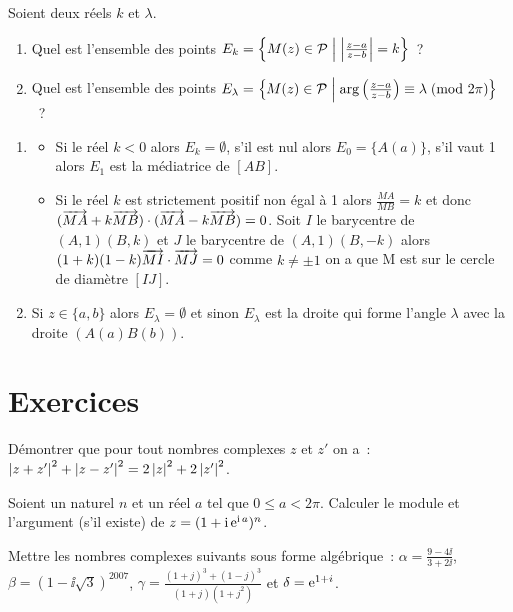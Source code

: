 Soient deux réels \(k\) et \(\lambda\).
\begin{enumerate}
  \item Quel est l'ensemble des points \(E_k = \left\{M(z) \in 
    \mathcal{P}\mathrel{}\middle|\mathrel{}\left\lvert\frac{z-a}{z-b}\right\rvert = k\right\}\)~?
  \item Quel est l'ensemble des points \(E_\lambda = \left\{M(z) \in 
    \mathcal{P}\mathrel{}\middle|\mathrel{}\arg \left(\frac{z-a}{z-b} \right) \equiv \lambda\!\pmod {2\pi}\right\}\)~?
\end{enumerate}
\begin{enumerate}
  \item 
    \begin{itemize}
      \item Si le réel \(k<0\) alors \(E_k = \emptyset\), s'il est nul 
        alors \(E_0 = \{A(a)\}\), s'il vaut 1 alors \(E_1\) est la 
        médiatrice de \([AB]\).
      \item Si le réel \(k\) est strictement positif non égal à 1 alors 
        \(\frac{MA}{MB} = k\) et donc \((\overrightarrow{MA} + k\overrightarrow{MB}) \cdot 
        (\overrightarrow{MA}-k\overrightarrow{MB}) = 0\). Soit \(I\) le barycentre de 
        \((A,1)(B,k)\) et \(J\) le barycentre de \((A,1)(B,-k)\) alors 
        \((1 + k)(1-k) \overrightarrow{MI} \cdot \overrightarrow{MJ}  = 0\) comme \(k \neq 
        \pm 1\) on a que M est sur le cercle de diamètre \([IJ]\).
    \end{itemize}
  \item Si \(z \in \{a,b\}\) alors \(E_\lambda = \emptyset\) et sinon 
    \(E_\lambda\) est la droite qui forme l'angle \(\lambda\) avec la droite 
    \((A(a)B(b))\).
\end{enumerate}

\section{Exercices}

\begin{exercice}
  Démontrer que pour tout nombres complexes \(z\) et \(z'\) on a~:\(\left\lvert z + 
  z'\right\rvert^2 + \left\lvert z-z'\right\rvert^2 = 2\left\lvert z\right\rvert^2 + 2\left\lvert z'\right\rvert^2\).
\end{exercice}

\begin{exercice}
  Soient un naturel \(n\) et un réel \(a\) tel que \(0 \leqslant a < 2\pi\).  
  Calculer le module et l'argument (s'il existe) de \(z = (1 + \operatorname{i}\operatorname{e}^{\operatorname{i} 
  a})^n\).
\end{exercice}

\begin{exercice}
  Mettre les nombres complexes suivants sous forme algébrique~: \(\alpha = 
  \frac{9-4\ii}{3 + 2\ii}\), \(\beta = (1-\ii\sqrt{3})^{2007}\), \(\gamma = 
  \frac{(1 + j)^3 + (1-j)^3}{(1 + j)(1 + j^2)}\) et \( \delta = \operatorname{e}^{1 + i}\).
\end{exercice}

